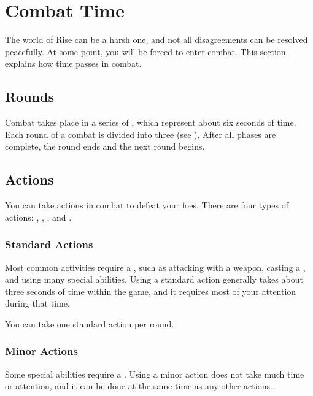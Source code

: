 \section{Combat Time}\label{Combat Time}
    The world of Rise can be a harsh one, and not all disagreements can be resolved peacefully.
    At some point, you will be forced to enter combat.
    This section explains how time passes in combat.

    \subsection{Rounds}\label{Rounds}

        Combat takes place in a series of , which represent about six seconds of time.
        Each round of a combat is divided into three  (see ).
        After all phases are complete, the round ends and the next round begins.

    \subsection{Actions}\label{Actions}

        You can take actions in combat to defeat your foes.
        There are four types of actions: , , , and .

        \subsubsection{Standard Actions}\label{Standard Actions}
            Most common activities require a , such as attacking with a weapon, casting a , and using many special abilities.
            Using a standard action generally takes about three seconds of time within the game, and it requires most of your attention during that time.

            You can take one standard action per round.

        \subsubsection{Minor Actions}\label{Minor Actions}
            Some special abilities require a .
            Using a minor action does not take much time or attention, and it can be done at the same time as any other actions.


